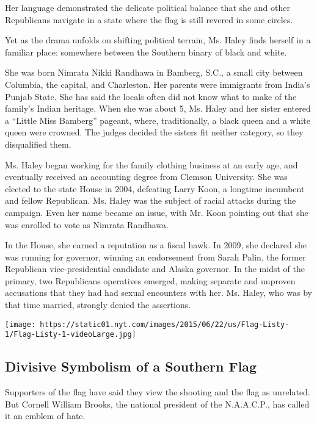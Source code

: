 Her language demonstrated the delicate political balance that she and
other Republicans navigate in a state where the flag is still revered in
some circles.

Yet as the drama unfolds on shifting political terrain, Ms. Haley finds
herself in a familiar place: somewhere between the Southern binary of
black and white.

She was born Nimrata Nikki Randhawa in Bamberg, S.C., a small city
between Columbia, the capital, and Charleston. Her parents were
immigrants from India's Punjab State. She has said the locals often did
not know what to make of the family's Indian heritage. When she was
about 5, Ms. Haley and her sister entered a ``Little Miss Bamberg''
pageant, where, traditionally, a black queen and a white queen were
crowned. The judges decided the sisters fit neither category, so they
disqualified them.

Ms. Haley began working for the family clothing business at an early
age, and eventually received an accounting degree from Clemson
University. She was elected to the state House in 2004, defeating Larry
Koon, a longtime incumbent and fellow Republican. Ms. Haley was the
subject of racial attacks during the campaign. Even her name became an
issue, with Mr. Koon pointing out that she was enrolled to vote as
Nimrata Randhawa.

In the House, she earned a reputation as a fiscal hawk. In 2009, she
declared she was running for governor, winning an endorsement from Sarah
Palin, the former Republican vice-presidential candidate and Alaska
governor. In the midst of the primary, two Republicans operatives
emerged, making separate and unproven accusations that they had had
sexual encounters with her. Ms. Haley, who was by that time married,
strongly denied the assertions.

\href{https://www.nytimes.com/interactive/2015/06/22/us/Divisive-Symbolism-of-a-Southern-Flag.html}{}

\texttt{[image: https://static01.nyt.com/images/2015/06/22/us/Flag-Listy-1/Flag-Listy-1-videoLarge.jpg]}

\hypertarget{divisive-symbolism-of-a-southern-flag}{%
\subsection{Divisive Symbolism of a Southern
Flag}\label{divisive-symbolism-of-a-southern-flag}}

Supporters of the flag have said they view the shooting and the flag as
unrelated. But Cornell William Brooks, the national president of the
N.A.A.C.P., has called it an emblem of hate.

